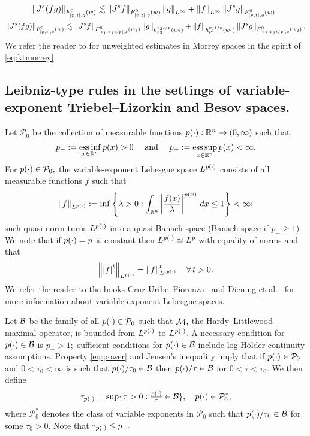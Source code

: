 \begin{equation*}
\norm{J^s(fg)}{\itlw{[p,t]}{0}{q}{w}} \lesssim \norm{J^sf}{\itlw{[p,t]}{0}{q}{w}} \norm{g}{L^\infty} +  \norm{f}{L^\infty}   \norm{J^sg}{\itlw{[p,t]}{0}{q}{w}};
\end{equation*}
\begin{equation*}
\norm{J^s(fg)}{\itlw{[p,t]}{0}{q}{w}} \lesssim \norm{J^sf}{\itlw{[p_1,p_1t/p]}{0}{q}{w_1}} \norm{g}{h_{p_2}^{p_2t/p}(w_2)} +  \norm{f}{h_{p_1}^{p_1t/p}(w_1)}   \norm{J^sg}{\itlw{[p_2,p_2t/p]}{0}{q}{w_2}}.
\end{equation*}
We refer the reader to \cite[Theorem 6.3]{MR3513582} for unweighted estimates in Morrey spaces in the spirit of  \eqref{eq:ktmorrey}.




\subsection{Leibniz-type rules in the settings of variable-exponent Triebel--Lizorkin and Besov spaces.}
Let  $\mathcal{P}_0$ be the collection of  measurable functions $\pp : \rn \rightarrow (0,\infty)$  such that
\begin{equation*}
p_- := \essinf_{x\in \rn} p(x)>0 \quad\text{ and } \quad p_+ := \esssup_{x\in \rn} p(x)<\infty.
\end{equation*}
For $\pp\in\mathcal{P}_0,$   the variable-exponent Lebesgue space $\Lp$
consists of all measurable functions $f$ such that 
\begin{equation*}
\norm{f}{L^{p(\cdot)}}:=\inf\left\{\lambda>0: \int_{\rn} \abs{\frac{f(x)}{\lambda}}^{p(x)}\,dx\le 1\right\}<\infty;
\end{equation*}
such quasi-norm turns $\Lp$ into  a quasi-Banach  space (Banach space if $p_-\ge1$). We note that if $\pp=p$ is constant then  $\Lp\simeq L^p$ with equality of norms and that
\begin{equation}\label{eq:power}
\norm{\abs{f}^t}{\Lp}=\norm{f}{L^{t\pp}}^t\quad \forall\, t>0.
\end{equation} 
We refer the reader to the books Cruz-Uribe--Fiorenza~\cite{MR3026953} and Diening et al.~\cite{MR2790542} for more information about variable-exponent Lebesgue spaces. 

Let $\B$ be the family of all $\pp \in \mathcal{P}_0$ such that $\M,$  the Hardy--Littlewood maximal operator, is bounded from $\Lp$ to $\Lp.$ A necessary condition for $\pp\in \B$ is  $p_->1;$   sufficient conditions for $\pp \in \B$ include  log-H\"older continuity assumptions.
Property \eqref{eq:power} and Jensen's inequality imply that if $\pp\in \mathcal{P}_0$ and $0<\tau_0<\infty$ is such that $\pp/\tau_0\in\B$ then $\pp/\tau\in\B$ for $0<\tau<\tau_0.$ We then define
\begin{equation*}
\tau_{\pp}=\sup\{\tau>0:\fr{\pp}{\tau}\in \B\},\quad \pp\in \mathcal{P}_0^*,
\end{equation*}
where $\mathcal{P}_0^*$ denotes the class of variable exponents in $\mathcal{P}_0$ such that $\pp/\tau_0\in\B$ for some $\tau_0>0.$ Note that $\tau_{\pp}\le p_-.$


